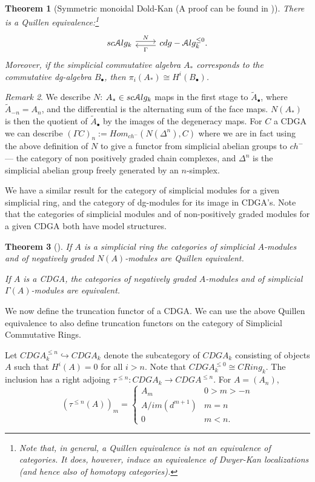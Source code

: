 \documentclass[10pt,a4paper,reqno,oneside]{book} %
\theoremstyle{plain}
\newtheorem{thm}{Theorem}[section]
\theoremstyle{definition}
\theoremstyle{remark}
\newtheorem{rem}[thm]{Remark}
\numberwithin{equation}{section}
\begin{document}
\begin{thm}[Symmetric monoidal Dold-Kan (A proof can be found in \cite{schwede2003equivalences})]
There is a Quillen equivalence:\footnote{Note that, in general, a Quillen equivalence is not an equivalence of categories.
It does, however, induce an equivalence of Dwyer-Kan localizations (and hence also of homotopy categories).}
\[
\begin{tikzcd}
	sc\cA lg_k \arrow[shift left]{r}{N} & cdg-\cA lg_k^{\leq 0} \arrow[shift left]{l}{\Gamma}.	
\end{tikzcd}
\]
Moreover, if the simplicial commutative algebra $A_*$ corresponds to the commutative dg-algebra $B_{\bullet}$, then
$\pi_i(A_*) \cong H^i(B_{\bullet})$.
\end{thm}

\begin{rem}
We describe $N$:
$A_* \in sc\mathcal A lg_k$ maps in the first stage to $\tilde A_{\bullet}$, where $\tilde A_{-n} = A_n$, and the differential 
is the alternating sum of the face maps.
$N(A_*)$ is then the quotient of $\tilde A_{\bullet}$ by the images of the degeneracy maps.
For $C$ a CDGA we can describe $(\Gamma C)_{n}:=Hom_{ch^{-}}(N(\Delta^{n}), C)$ where we are in fact using the above definition of $N$ to give a functor from simplicial abelian groups to $ch^{-}$ --- the category of non positively graded chain complexes, and $\Delta^{n}$ is the simplicial abelian group freely generated by an $n$-simplex.  
\end{rem}

We have a similar result for the category of simplicial modules for a given simplicial ring, and the category of dg-modules for its image in CDGA's.  Note that the categories of simplicial modules and of non-positively graded modules for a given CDGA both have model structures.

\begin{thm}[\cite{schwede2003equivalences}]
If $A$ is a simplicial ring the categories of simplicial $A$-modules and of negatively graded $N(A)$-modules are Quillen equivalent.

If $A$ is a CDGA, the categories of negatively graded $A$-modules and of simplicial $\Gamma(A)$-modules are equivalent.
\end{thm}


We now define the truncation functor of a CDGA.  We can use the above Quillen equivalence to also define truncation functors on the category of Simplicial Commutative Rings.

Let $CDGA_{k}^{\leq n} \hookrightarrow CDGA_{k}$ denote the subcategory of $CDGA_{k}$ consisting of objects $A$ such that $H^{i}(A) =0$ for all $i>n$.  Note that $CDGA_{k}^{\leq 0} \cong CRing_{k}$.  The inclusion has a right adjoing $\tau^{\leq n}: CDGA_{k}\rightarrow CDGA^{\leq n}$.  For $A=(A_{n})$, \[(\tau^{\leq n}(A))_{m}= \begin{cases} 
      A_{m} & 0 > m > -n \\
      A/im(d^{m+1}) & m=n \\
      0 & m < n.
   \end{cases}
\]
\end{document}
